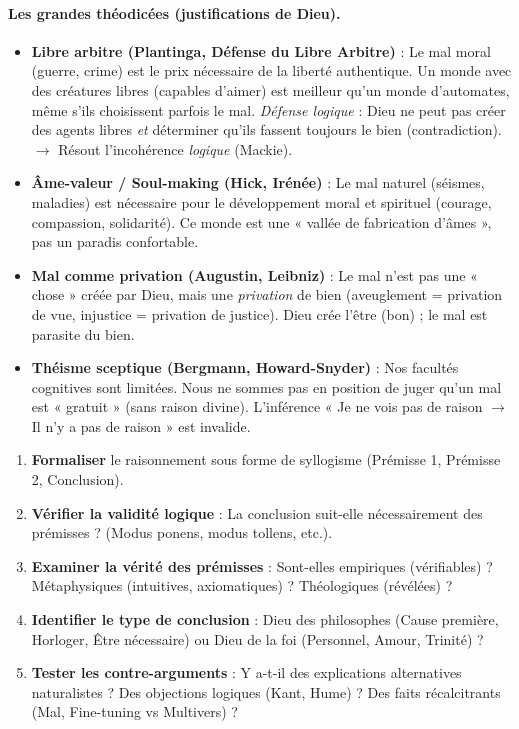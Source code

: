 \documentclass[11pt]{article}
\begin{document}
\paragraph{Les grandes théodicées (justifications de Dieu).}
\begin{itemize}
    \item \textbf{Libre arbitre (Plantinga, Défense du Libre Arbitre)} : Le mal moral (guerre, crime) est le prix nécessaire de la liberté authentique. Un monde avec des créatures libres (capables d'aimer) est meilleur qu'un monde d'automates, même s'ils choisissent parfois le mal. \emph{Défense logique} : Dieu ne peut pas créer des agents libres \emph{et} déterminer qu'ils fassent toujours le bien (contradiction). $\rightarrow$ Résout l'incohérence \emph{logique} (Mackie).
    \item \textbf{Âme-valeur / Soul-making (Hick, Irénée)} : Le mal naturel (séismes, maladies) est nécessaire pour le développement moral et spirituel (courage, compassion, solidarité). Ce monde est une « vallée de fabrication d'âmes », pas un paradis confortable.
    \item \textbf{Mal comme privation (Augustin, Leibniz)} : Le mal n'est pas une « chose » créée par Dieu, mais une \emph{privation} de bien (aveuglement = privation de vue, injustice = privation de justice). Dieu crée l'être (bon) ; le mal est parasite du bien.
    \item \textbf{Théisme sceptique (Bergmann, Howard-Snyder)} : Nos facultés cognitives sont limitées. Nous ne sommes pas en position de juger qu'un mal est « gratuit » (sans raison divine). L'inférence « Je ne vois pas de raison $\rightarrow$ Il n'y a pas de raison » est invalide.
\end{itemize}

\begin{methode}
\begin{enumerate}
    \item \textbf{Formaliser} le raisonnement sous forme de syllogisme (Prémisse 1, Prémisse 2, Conclusion).
    \item \textbf{Vérifier la validité logique} : La conclusion suit-elle nécessairement des prémisses ? (Modus ponens, modus tollens, etc.).
    \item \textbf{Examiner la vérité des prémisses} : Sont-elles empiriques (vérifiables) ? Métaphysiques (intuitives, axiomatiques) ? Théologiques (révélées) ?
    \item \textbf{Identifier le type de conclusion} : Dieu des philosophes (Cause première, Horloger, Être nécessaire) ou Dieu de la foi (Personnel, Amour, Trinité) ?
    \item \textbf{Tester les contre-arguments} : Y a-t-il des explications alternatives naturalistes ? Des objections logiques (Kant, Hume) ? Des faits récalcitrants (Mal, Fine-tuning vs Multivers) ?
\end{enumerate}
\end{methode}
\end{document}
